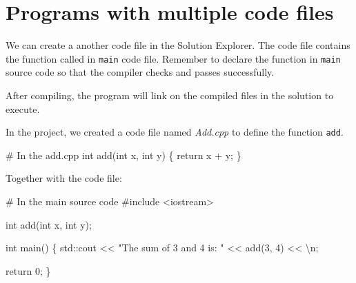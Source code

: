 \documentclass[
  letterpaper,
  DIV=11,
  numbers=noendperiod]{scrreprt}
\newenvironment{Shaded}{\begin{snugshade}}{\end{snugshade}}
\newcommand{\CommentTok}[1]{\textcolor[rgb]{0.37,0.37,0.37}{#1}}
\newcommand{\DecValTok}[1]{\textcolor[rgb]{0.68,0.00,0.00}{#1}}
\newcommand{\ErrorTok}[1]{\textcolor[rgb]{0.68,0.00,0.00}{#1}}
\newcommand{\FunctionTok}[1]{\textcolor[rgb]{0.28,0.35,0.67}{#1}}
\newcommand{\NormalTok}[1]{\textcolor[rgb]{0.00,0.23,0.31}{#1}}
\newcommand{\SpecialCharTok}[1]{\textcolor[rgb]{0.37,0.37,0.37}{#1}}
\newcommand{\StringTok}[1]{\textcolor[rgb]{0.13,0.47,0.30}{#1}}
\begin{document}
\hypertarget{programs-with-multiple-code-files}{%
\section{Programs with multiple code
files}\label{programs-with-multiple-code-files}}

We can create a another code file in the Solution Explorer. The code
file contains the function called in \texttt{main} code file. Remember
to declare the function in \texttt{main} source code so that the
compiler checks and passes successfully.

After compiling, the program will link on the compiled files in the
solution to execute.

In the project, we created a code file named \emph{Add.cpp} to define
the function \texttt{add}.

\begin{Shaded}
\begin{Highlighting}[]
\CommentTok{\# In the add.cpp}
\NormalTok{int }\FunctionTok{add}\NormalTok{(int x, int y)}
\NormalTok{\{}
\NormalTok{    return x }\SpecialCharTok{+}\NormalTok{ y;}
\NormalTok{\}}
\end{Highlighting}
\end{Shaded}

Together with the code file:

\begin{Shaded}
\begin{Highlighting}[]
\CommentTok{\# In the main source code}
\CommentTok{\#include \textless{}iostream\textgreater{}}

\NormalTok{int }\FunctionTok{add}\NormalTok{(int x, int y);}

\NormalTok{int }\FunctionTok{main}\NormalTok{()}
\NormalTok{\{}
\NormalTok{    std}\SpecialCharTok{::}\NormalTok{cout }\SpecialCharTok{\textless{}}\ErrorTok{\textless{}} \StringTok{"The sum of 3 and 4 is: "} \SpecialCharTok{\textless{}}\ErrorTok{\textless{}} \FunctionTok{add}\NormalTok{(}\DecValTok{3}\NormalTok{, }\DecValTok{4}\NormalTok{) }\SpecialCharTok{\textless{}}\ErrorTok{\textless{}} \StringTok{\textquotesingle{}}\SpecialCharTok{\textbackslash{}n}\StringTok{\textquotesingle{}}\NormalTok{;}

\NormalTok{    return }\DecValTok{0}\NormalTok{;}
\NormalTok{\}}
\end{Highlighting}
\end{Shaded}
\end{document}
